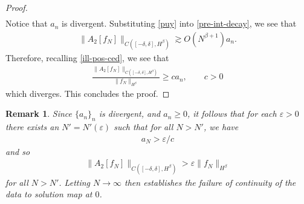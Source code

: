 \documentclass[12pt,reqno]{amsart}
\numberwithin{equation}{section}  %
\newcommand{\ee}{\varepsilon}
\newtheorem{remark}[theorem]{Remark}
\begin{document}
\begin{proof}
\begin{equation*}
\begin{split}
\end{split}
\end{equation*}
%
%
Notice that $a_{n}$ is divergent. Substituting \eqref{puy} into \eqref{pre-int-decay}, we see that 
%
%
\begin{equation*}
\begin{split}
\|A_{2}[f_{N}]\|_{C( [-\delta, \delta], H^{\beta})}
   \gtrsim O(N^{\beta+1}) a_{n}.
\end{split}
\end{equation*}
%
Therefore, recalling \eqref{ill-pos-ced}, we see that
%
%
\begin{equation*}
\begin{split}
\frac{\|A_{2}[f_{N}]\|_{C( [-\delta, \delta], H^{\beta})}}{\| f_{N}
\|_{H^{\beta}}} \ge c a_{n}, \qquad c > 0 
\end{split}
\end{equation*}
%
%
which diverges. This concludes the proof.
%
%
%
%
%
\end{proof}
%
%
\begin{framed}
\begin{remark}
 Since $\{a_{n}\}_{n}$ is divergent, and $a_{n} \ge 0$, it follows that for each $\ee > 0$ there exists an $N' = N'(\ee)$ such that for all $N > N'$, we have
  \begin{equation*}
  \begin{split}
    a_{N} > \ee/c
  \end{split}
  \end{equation*}
  and so
  \begin{equation*}
  \begin{split}
  \|A_{2}[f_{N}]\|_{C( [-\delta, \delta], H^{\beta})}
  > \ee {\| f_{N} \|_{H^{\beta}}}
  \end{split}
  \end{equation*}
  for all $N > N'$. Letting $N \to \infty$ then establishes the failure of continuity of the data to solution map at $0$.  
\label{rem:calc}
\end{remark}
\end{framed}
%
%
%
%
%
\end{document}
